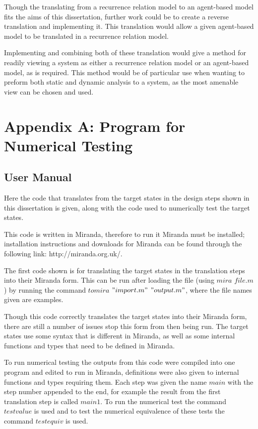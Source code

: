 \documentclass{article}
\begin{document}
Though the translating from a recurrence relation model to an agent-based model fits the aims of this dissertation, further work could be to create a reverse translation and implementing it. This translation would allow a given agent-based model to be translated in a recurrence relation model. 

Implementing and combining both of these translation would give a method for readily viewing a system as either a recurrence relation model or an agent-based model, as is required. This method would be of particular use when wanting to preform both static and dynamic analysis to a system, as the most amenable view can be chosen and used. 










\newpage 
\section*{Appendix A: Program for Numerical Testing}
\subsection*{User Manual}
Here the code that translates from the target states in the design steps shown in this dissertation is given, along with the code used to numerically test the target states.

This code is written in Miranda, therefore to run it Miranda must be installed; installation instructions and downloads for Miranda can be found through the following link: http://miranda.org.uk/. 

The first code shown is for translating the target states in the translation steps into their Miranda form. This can be run after loading the file (using $mira$ $file.m$) by running the command  $tomira$ $"import.m"$ $"output.m"$, where the file names given are examples. 

Though this code correctly translates the target states into their Miranda form, there are still a number of issues stop this form from then being run. The target states use some syntax that is different in Miranda, as well as some internal functions and types that need to be defined in Miranda. 

To run numerical testing the outputs from this code were compiled into one program and edited to run in Miranda, definitions were also given to internal functions and types requiring them. Each step was given the name $main$ with the step number appended to the end, for example the result from the first translation step is called $main1$. To run the numerical test the command $testvalue$ is used and to test the numerical equivalence of these tests the command $testequiv$ is used. 
\end{document}

